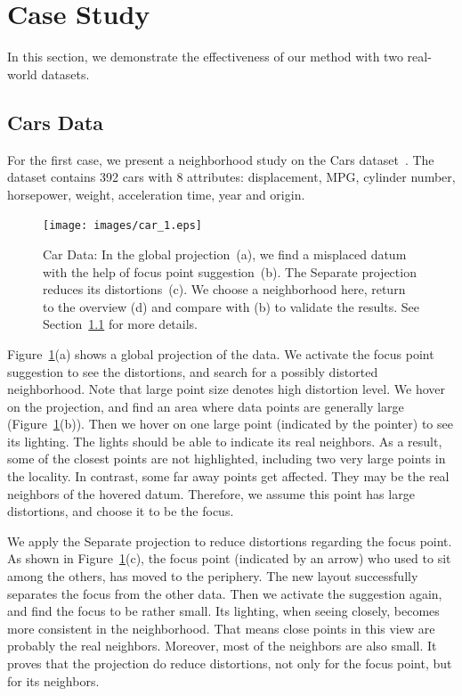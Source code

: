 \section{Case Study}
\label{section:casestudy}
In this section, we demonstrate the effectiveness of our method with two real-world datasets.

\subsection{Cars Data}
\label{case:car}
For the first case, we present a neighborhood study on the Cars dataset~\cite{Lichman:2013}. The dataset contains 392 cars with 8 attributes: displacement, MPG, cylinder number, horsepower, weight, acceleration time, year and origin.

\begin{figure}[htbp]
\centering
  \texttt{[image: images/car\_1.eps]}%
  \caption{Car Data: In the global projection~(a), we find a misplaced datum with the help of focus point suggestion~(b). The Separate projection reduces its distortions~(c). We choose a neighborhood here, return to the overview (d) and compare with (b) to validate the results. See Section~\ref{case:car} for more details.}
\label{fig:car}
  \end{figure}

Figure~\ref{fig:car}(a) shows a global projection of the data. We activate the focus point suggestion to see the distortions, and search for a possibly distorted neighborhood. Note that large point size denotes high distortion level. We hover on the projection, and find an area where data points are generally large (Figure~\ref{fig:car}(b)). Then we hover on one large point (indicated by the pointer) to see its lighting. The lights should be able to indicate its real neighbors. As a result, some of the closest points are not highlighted, including two very large points in the locality. In contrast, some far away points get affected. They may be the real neighbors of the hovered datum. Therefore, we assume this point has large distortions, and choose it to be the focus.

We apply the Separate projection to reduce distortions regarding the focus point. As shown in Figure~\ref{fig:car}(c), the focus point (indicated by an arrow) who used to sit among the others, has moved to the periphery. The new layout successfully separates the focus from the other data. Then we activate the suggestion again, and find the focus to be rather small. Its lighting, when seeing closely, becomes more consistent in the neighborhood. That means close points in this view are probably the real neighbors. Moreover, most of the neighbors are also small. It proves that the projection do reduce distortions, not only for the focus point, but for its neighbors.


